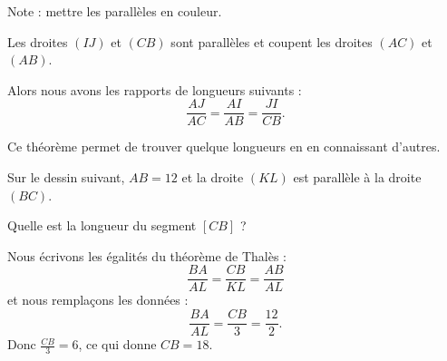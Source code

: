 



Note : mettre les parallèles en couleur.

\begin{theorem}
    Les droites \( (IJ)\) et \( (CB)\) sont parallèles et coupent les droites \( (AC)\) et \( (AB)\).

\begin{center}
   
\end{center}

Alors nous avons les rapports de longueurs suivants :
\begin{equation}
    \frac{ AJ }{ AC }=\frac{ AI }{ AB }=\frac{ JI }{ CB }.
\end{equation}

\end{theorem}

Ce théorème permet de trouver quelque longueurs en en connaissant d'autres.

\begin{example}
    
    Sur le dessin suivant, \( AB=12\) et la droite \( (KL)\) est parallèle à la droite \( (BC)\).
\begin{center}
   
\end{center}
Quelle est la longueur du segment \( [CB]\) ?

Nous écrivons les égalités du théorème de Thalès :
\begin{equation}
    \frac{ BA }{ AL }=\frac{ CB }{ KL }=\frac{ AB }{ AL }
\end{equation}
et nous remplaçons les données :
\begin{equation}
    \frac{ BA }{ AL }=\frac{ CB }{ 3 }=\frac{ 12 }{ 2 }.
\end{equation}
Donc \( \frac{ CB }{ 3 }=6\), ce qui donne \( CB=18\).

\end{example}




